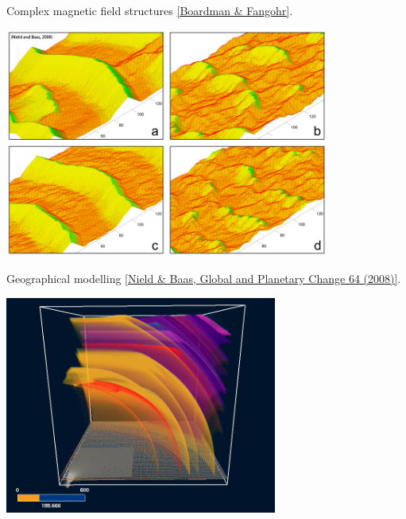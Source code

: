 \documentclass{beamer}
\begin{document}
\begin{frame}
\begin{overlayarea}{\textwidth}{0.8\textheight}
{\begin{center}
        Complex magnetic field structures \href{http://www.soton.ac.uk/~rpb/thesis.pdf}{\tiny [Boardman \& Fangohr]}.
      \end{center}
    }
    {
      \begin{center}
        \includegraphics[width=0.8\textwidth]{figures/3d_landscape_samples_NieldDunes}

        Geographical modelling {\tiny
          \href{http://dx.doi.org/10.1016/j.gloplacha.2008.10.002}{[Nield \&
            Baas, Global and Planetary Change 64 (2008)]}}.
      \end{center}
    }
    {
      \begin{center}
        \includegraphics[width=0.67\textwidth]{figures/collapse6}


\end{center}}
\end{overlayarea}
\end{frame}
\end{document}
